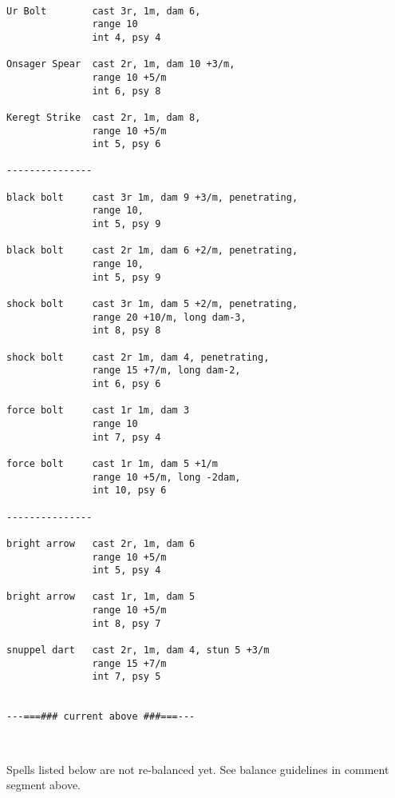

\

\small \begin{verbatim}
Ur Bolt        cast 3r, 1m, dam 6,
               range 10
               int 4, psy 4

Onsager Spear  cast 2r, 1m, dam 10 +3/m,
               range 10 +5/m
               int 6, psy 8

Keregt Strike  cast 2r, 1m, dam 8,
               range 10 +5/m
               int 5, psy 6

---------------

black bolt     cast 3r 1m, dam 9 +3/m, penetrating,
               range 10, 
               int 5, psy 9

black bolt     cast 2r 1m, dam 6 +2/m, penetrating,
               range 10,
               int 5, psy 9

shock bolt     cast 3r 1m, dam 5 +2/m, penetrating,
               range 20 +10/m, long dam-3,
               int 8, psy 8

shock bolt     cast 2r 1m, dam 4, penetrating,
               range 15 +7/m, long dam-2,
               int 6, psy 6

force bolt     cast 1r 1m, dam 3
               range 10
               int 7, psy 4

force bolt     cast 1r 1m, dam 5 +1/m
               range 10 +5/m, long -2dam,
               int 10, psy 6

---------------

bright arrow   cast 2r, 1m, dam 6
               range 10 +5/m
               int 5, psy 4

bright arrow   cast 1r, 1m, dam 5
               range 10 +5/m
               int 8, psy 7

snuppel dart   cast 2r, 1m, dam 4, stun 5 +3/m
               range 15 +7/m
               int 7, psy 5


---===### current above ###===---
\end{verbatim} \normalsize

\

\noindent Spells listed below are not re-balanced yet.
See balance guidelines in comment segment above.

